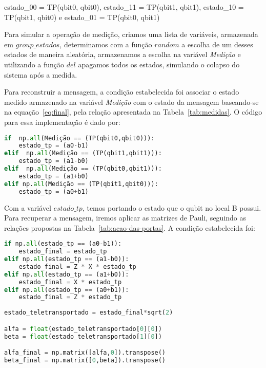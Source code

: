 \begin{center}
\begin{tiny}estado\_00 = TP(qbit0, qbit0), estado\_11 = TP(qbit1, qbit1),\linebreak
estado\_10 = TP(qbit1, qbit0) e \quad estado\_01 = TP(qbit0, qbit1)\end{tiny}
\end{center}

Para simular a operação de medição, criamos uma lista de variáveis, armazenada em \textit{$group\_estados$}, determinamos com a função \textit{$random$} a escolha de um desses estados de maneira aleatória, armazenamos a escolha na variável \textit{Medição} e utilizando a função \textit{$del$} apagamos todos os estados, simulando o colapso do sistema após a medida.

Para reconstruir a mensagem, a condição estabelecida foi associar o estado medido armazenado na variável \textit{Medição} com o estado da mensagem baseando-se na equação~\eqref{eq:final}, pela relação apresentada na Tabela~\ref{tab:medidas}. O código para essa implementação é dado por:

\begin{center}
\begin{lstlisting}[language=Python, caption=Relação de condição para o estado teletransportado em função do estado medido em A.]
if  np.all(Medição == (TP(qbit0,qbit0))):
    estado_tp = (a0-b1)
elif  np.all(Medição == (TP(qbit1,qbit1))):
    estado_tp = (a1-b0)
elif  np.all(Medição == (TP(qbit0,qbit1))):
    estado_tp = (a1+b0)
elif np.all(Medição == (TP(qbit1,qbit0))):
    estado_tp = (a0+b1)
\end{lstlisting}
\end{center}

Com a variável \textit{$estado\_tp$}, temos portando o estado que o qubit no local B possui. Para recuperar a mensagem, iremos aplicar as matrizes de Pauli, seguindo as relações propostas na Tabela~\ref{tab:acao-das-portas}. A condição estabelecida foi:

\begin{center}
\begin{lstlisting}[language=Python, caption=Relação de condição para aplicação das portas de Pauli.]
if np.all(estado_tp == (a0-b1)):
    estado_final = estado_tp
elif np.all(estado_tp == (a1-b0)):
    estado_final = Z * X * estado_tp 
elif np.all(estado_tp == (a1+b0)):
    estado_final = X * estado_tp 
elif np.all(estado_tp == (a0+b1)):
    estado_final = Z * estado_tp 
    
estado_teletransportado = estado_final*sqrt(2)    

alfa = float(estado_teletransportado[0][0])
beta = float(estado_teletransportado[1][0])

alfa_final = np.matrix([alfa,0]).transpose()
beta_final = np.matrix([0,beta]).transpose()
\end{lstlisting}
\end{center}

